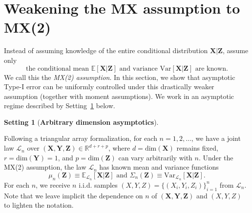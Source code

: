 \documentclass[12pt]{article}
\theoremstyle{definition}
\newtheorem{setting}{Setting}
\theoremstyle{remark}
\newcommand{\prx}{\bm X}
\newcommand{\srx}{X}
\newcommand{\prz}{\bm Z}
\newcommand{\srz}{Z}
\newcommand{\pry}{{\bm Y}}
\newcommand{\sry}{Y}
\begin{document}
\section{Weakening the MX assumption to MX(2)} \label{sec:weakening}

Instead of assuming knowledge of the entire conditional distribution $\prx|\prz$, assume only 
\begin{equation}
\text{the conditional mean } \mathbb E[\prx|\prz] \text{ and variance } \text{Var}[\prx|\prz] \text{ are known}.
\label{mx-assumption}
\end{equation}
We call this the \textit{MX(2) assumption}. In this section, we show that asymptotic Type-I error can be uniformly controlled under this drastically weaker assumption (together with moment assumptions). We work in an asymptotic regime described by Setting~\ref{setting:asymptotic} below.

\begin{setting}[\bf Arbitrary dimension asymptotics] \label{setting:asymptotic}

Following a triangular array formalization, for each $n = 1, 2, \dots$, we have a joint law $\mathcal L_n$ over $(\prx, \pry, \prz) \in \mathbb R^{d + r + p}$, where $d = \text{dim}(\prx)$ remains fixed, $r = \text{dim}(\pry) = 1$, and $p = \text{dim}(\prz)$ can vary arbitrarily with $n$. Under the MX(2) assumption, the law $\mathcal L_n$ has known mean and variance functions
\begin{equation}
	\mu_n(\prz) \equiv \mathbb E_{\mathcal L_n}[\prx|\prz]  \text{ and } \Sigma_n(\prz) \equiv \text{Var}_{\mathcal L_n}[\prx|\prz].
	\label{conditional-mean-variance}
\end{equation}
For each $n$, we receive $n$ i.i.d. samples $(\srx, \sry, \srz) = \{(\srx_i, \sry_i, \srz_i)\}_{i = 1}^n$ from $\mathcal L_n$. Note that we leave implicit the dependence on $n$ of $(\prx,\pry,\prz)$ and $(X,Y,Z)$ to lighten the notation. 

\end{setting}
\end{document}
